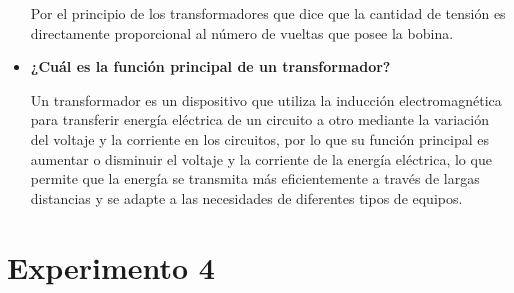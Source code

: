 \documentclass[letterpaper, 12pt]{report}
\begin{document}
\begin{itemize}[label=$\bullet$]
            Por el principio de los transformadores que dice que la
            cantidad de tensión es directamente proporcional al número
            de vueltas que posee la bobina.

      \item \textbf{¿Cuál es la función principal de un transformador?}

            Un transformador es un dispositivo que utiliza la inducción
            electromagnética para transferir energía eléctrica de un
            circuito a otro mediante la variación del voltaje y la
            corriente en los circuitos, por lo que su función principal
            es aumentar o disminuir el voltaje y la corriente de la
            energía eléctrica, lo que permite que la energía se
            transmita más eficientemente a través de largas distancias
            y se adapte a las necesidades de diferentes tipos de
            equipos.
\end{itemize}

\section*{Experimento 4}
\end{document}
